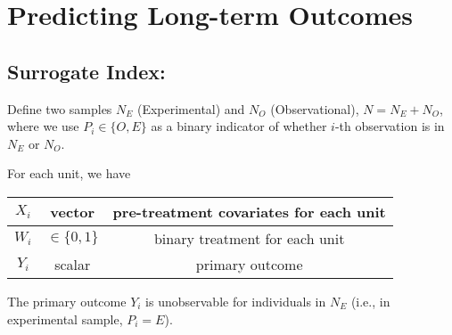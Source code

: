 \chapter{Predicting Long-term Outcomes}
\section{Surrogate Index: \cite{athey2019surrogate}}
Define two samples $N_E$ (Experimental) and $N_O$ (Observational), $N=N_E+N_O$, where we use $P_i\in\{O,E\}$ as a binary indicator of whether $i$-th observation is in $N_E$ or $N_O$.

For each unit, we have
\begin{center}
    \begin{tabular}{ccc}
        \hline
            $X_i$& vector & pre-treatment covariates for each unit\\
        \hline
            $W_i$& $\in\{0,1\}$ & binary treatment for each unit\\
        \hline
            $Y_i$& scalar & primary outcome\\
        \hline
    \end{tabular}
\end{center}
The primary outcome $Y_i$ is unobservable for individuals in $N_E$ (i.e., in experimental sample, $P_i=E$).